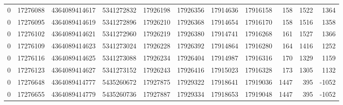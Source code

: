 \begin{tabular}{rrrrrrrrrrr}
0 & 17276088 & 4364089414617 & 5341272832 & 17926198 & 17926356 & 17914636 & 17916158 & 158 & 1522 & 1364 \\
0 & 17276095 & 4364089414619 & 5341272896 & 17926210 & 17926368 & 17914654 & 17916170 & 158 & 1516 & 1358 \\
0 & 17276102 & 4364089414621 & 5341272960 & 17926219 & 17926380 & 17914741 & 17916268 & 161 & 1527 & 1366 \\
0 & 17276109 & 4364089414623 & 5341273024 & 17926228 & 17926392 & 17914864 & 17916280 & 164 & 1416 & 1252 \\
0 & 17276116 & 4364089414625 & 5341273088 & 17926234 & 17926404 & 17914987 & 17916316 & 170 & 1329 & 1159 \\
0 & 17276123 & 4364089414627 & 5341273152 & 17926243 & 17926416 & 17915023 & 17916328 & 173 & 1305 & 1132 \\
0 & 17276648 & 4364089414777 & 5435260672 & 17927875 & 17929322 & 17918641 & 17919036 & 1447 & 395 & -1052 \\
0 & 17276655 & 4364089414779 & 5435260736 & 17927887 & 17929334 & 17918653 & 17919048 & 1447 & 395 & -1052 \\
\bottomrule
\end{tabular}
